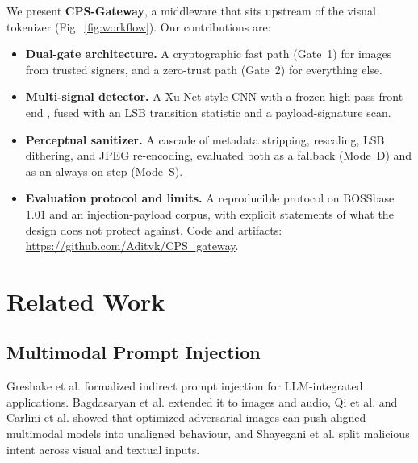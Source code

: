 \documentclass[conference]{IEEEtran}
\begin{document}
We present \textbf{CPS-Gateway}, a middleware that sits upstream of the visual tokenizer (Fig.~\ref{fig:workflow}). Our contributions are:
\begin{itemize}
    \item \textbf{Dual-gate architecture.} A cryptographic fast path (Gate~1) for images from trusted signers, and a zero-trust path (Gate~2) for everything else.
    \item \textbf{Multi-signal detector.} A Xu-Net-style CNN with a frozen high-pass front end \cite{xu2016structural}, fused with an LSB transition statistic and a payload-signature scan.
    \item \textbf{Perceptual sanitizer.} A cascade of metadata stripping, rescaling, LSB dithering, and JPEG re-encoding, evaluated both as a fallback (Mode~D) and as an always-on step (Mode~S).
    \item \textbf{Evaluation protocol and limits.} A reproducible protocol on BOSSbase 1.01 \cite{bas2011break} and an injection-payload corpus, with explicit statements of what the design does not protect against. Code and artifacts: \url{https://github.com/Aditvk/CPS_gateway}.
\end{itemize}

\section{Related Work}
\label{sec:related_work}

\subsection{Multimodal Prompt Injection}
Greshake et al. \cite{greshake2023not} formalized indirect prompt injection for LLM-integrated applications. Bagdasaryan et al. \cite{bagdasaryan2023abusing} extended it to images and audio, Qi et al. \cite{qi2024visual} and Carlini et al. \cite{carlini2023aligned} showed that optimized adversarial images can push aligned multimodal models into unaligned behaviour, and Shayegani et al. \cite{shayegani2024jailbreak} split malicious intent across visual and textual inputs.
\end{document}
